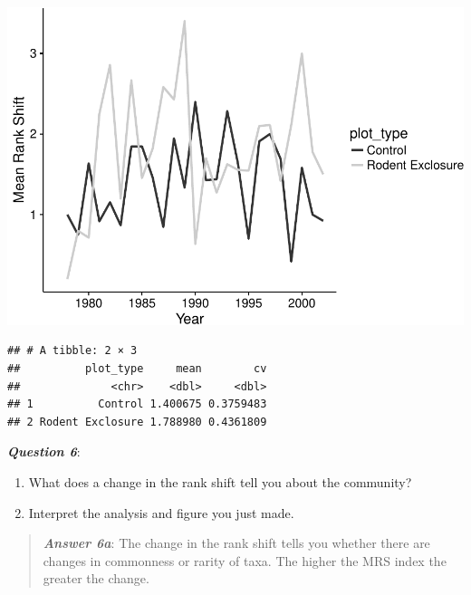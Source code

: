 \documentclass[]{article}
\newenvironment{Shaded}{\begin{snugshade}}{\end{snugshade}}
\newcommand{\KeywordTok}[1]{\textcolor[rgb]{0.13,0.29,0.53}{\textbf{{#1}}}}
\newcommand{\DataTypeTok}[1]{\textcolor[rgb]{0.13,0.29,0.53}{{#1}}}
\newcommand{\StringTok}[1]{\textcolor[rgb]{0.31,0.60,0.02}{{#1}}}
\newcommand{\NormalTok}[1]{{#1}}
\providecommand{\tightlist}{%
  \setlength{\itemsep}{0pt}\setlength{\parskip}{0pt}}
\begin{document}
\includegraphics{temporal_assignment_files/figure-latex/unnamed-chunk-7-1.pdf}

\begin{Shaded}
\end{Shaded}

\begin{verbatim}
## # A tibble: 2 × 3
##          plot_type     mean        cv
##              <chr>    <dbl>     <dbl>
## 1          Control 1.400675 0.3759483
## 2 Rodent Exclosure 1.788980 0.4361809
\end{verbatim}

\textbf{\emph{Question 6}}:

\begin{enumerate}
\def\labelenumi{\alph{enumi}.}
\tightlist
\item
  What does a change in the rank shift tell you about the community?
\item
  Interpret the analysis and figure you just made.
\end{enumerate}

\begin{quote}
\textbf{\emph{Answer 6a}}: The change in the rank shift tells you
whether there are changes in commonness or rarity of taxa. The higher
the MRS index the greater the change.
\end{quote}
\end{document}
